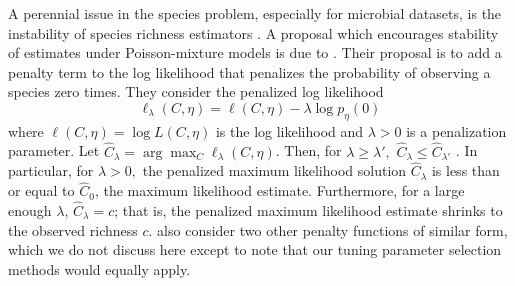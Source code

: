 \documentclass[12pt]{article}
\theoremstyle{break}
\theoremstyle{break}
\begin{document}
A perennial issue in the species problem, especially for microbial datasets, is the instability of species richness estimators \citep{Rocchetti:2011tv,willis_2015}.
%
%
%
A proposal which encourages stability of estimates under Poisson-mixture models is due to \citet{wang_2005}.  Their proposal is to add a penalty term to the log likelihood that penalizes the probability of observing a species zero times. They consider the
penalized log likelihood
\begin{equation}
\ell_\lambda(C, \eta) = \ell(C,\eta) - \lambda \log p_{\eta}(0)
\label{eq:wang_lindsay}
\end{equation}
where $\ell(C,\eta) = \log L(C, \eta)$ is the log likelihood and $\lambda > 0$ is a penalization parameter.
Let $\hat{C}_\lambda = \arg \max_{C} \ell_\lambda(C, \eta)$.
Then, for $\lambda \geq \lambda',$ $\hat{C}_\lambda \leq \hat{C}_{\lambda'}$ \citep[Theorem 1]{wang_2005}. In particular, for $\lambda > 0,$ the penalized maximum likelihood solution $\hat{C}_\lambda$ is less than or equal to $\hat{C}_0$, the maximum likelihood estimate. Furthermore, for a large enough $\lambda$, $\hat{C}_\lambda = c$; that is, the penalized maximum likelihood estimate shrinks to the observed richness $c$.
\citet{wang_2005} also consider two other penalty functions of similar form, which we do not discuss here except to note that our tuning parameter selection methods would equally apply.
\end{document}
